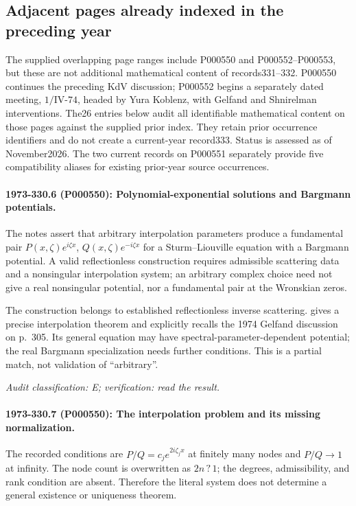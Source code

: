\subsection{Adjacent pages already indexed in the preceding year}

The supplied overlapping page ranges include P000550 and P000552--P000553, but these are not additional mathematical content of records331--332. P000550 continues the preceding KdV discussion; P000552 begins a separately dated meeting, \(1/\mathrm{IV}\text{-}74\), headed by Yura Koblenz, with Gelfand and Shnirelman interventions. The26 entries below audit all identifiable mathematical content on those pages against the supplied prior index. They retain prior occurrence identifiers and do not create a current-year record333. Status is assessed as of November2026. The two current records on P000551 separately provide five compatibility aliases for existing prior-year source occurrences.

\paragraph{1973-330.6 (P000550): Polynomial-exponential solutions and Bargmann potentials.}
The notes assert that arbitrary interpolation parameters produce a fundamental pair \(P(x,\zeta)e^{i\zeta x}\), \(Q(x,\zeta)e^{-i\zeta x}\) for a Sturm--Liouville equation with a Bargmann potential. A valid reflectionless construction requires admissible scattering data and a nonsingular interpolation system; an arbitrary complex choice need not give a real nonsingular potential, nor a fundamental pair at the Wronskian zeros.

The construction belongs to established reflectionless inverse scattering. \citet[\S3, Theorem~1]{shabat2014interpolation} gives a precise interpolation theorem and explicitly recalls the 1974 Gelfand discussion on p.~305. Its general equation may have spectral-parameter-dependent potential; the real Bargmann specialization needs further conditions. This is a partial match, not validation of “arbitrary”.

\emph{Audit classification: E; verification: read the result.}

\paragraph{1973-330.7 (P000550): The interpolation problem and its missing normalization.}
The recorded conditions are \(P/Q=c_j e^{2i\zeta_jx}\) at finitely many nodes and \(P/Q\to1\) at infinity. The node count is overwritten as \(2n\,?\,1\); the degrees, admissibility, and rank condition are absent. Therefore the literal system does not determine a general existence or uniqueness theorem.

